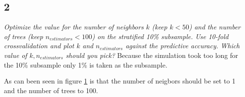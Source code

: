 \documentclass[a4paper,12pt]{article}
\begin{document}
{\subsection*{2}
{\it Optimize the value for the number of neighbors $k$ (keep $k < 50$) and the number of trees
(keep $n_{estimators} < 100$) on the stratified 10\% subsample. Use 10-fold crossvalidation and plot $k$ and $n_{estimators}$ against the predictive accuracy. Which value of $k, n_{estimators}$ should you pick?}
Because the simulation took too long for the 10\% subsample only 1\% is taken as the subsample. 
\begin{figure}[H]
\hfill
{}
\hfill
\caption{}
\label{Q22}
\end{figure}
As can been seen in figure \ref{Q22} is that the number of neigbors should be set to 1 and the number of trees to 100. 

}
\end{document}
